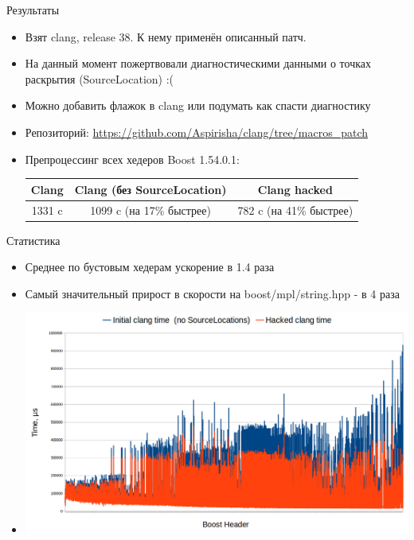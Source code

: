 \documentclass{beamer}
\begin{document}
\begin{frame}[t, fragile]{Результаты}
\begin{itemize}[<+->]
\item Взят clang, release 38. К нему применён описанный патч. 
\item На данный момент пожертвовали диагностическими данными о точках раскрытия (SourceLocation) :( 
\item Можно добавить флажок в clang или подумать как спасти диагностику
\item Репозиторий: \url{https://github.com/Aspirisha/clang/tree/macros_patch}
\item Препроцессинг всех хедеров Boost 1.54.0.1:
\begin{center}
\begin{tabular}{|c|c|c|}
\hline
Clang & Clang (без SourceLocation) & Clang hacked \\
\hline
1331 c & 1099 c (на 17\% быстрее) & 782 c (на 41\% быстрее) \\
\hline
\end{tabular}
\end{center}
\end{itemize}

\end{frame}

\begin{frame}[t, fragile]{Статистика}
\begin{itemize}[<+->]
\item Среднее по бустовым хедерам ускорение в 1.4 раза
\item Самый значительный прирост в скорости на boost/mpl/string.hpp - в 4 раза
\item \includegraphics[scale=0.2]{graph1}

\end{itemize} 
\end{frame}
\end{document}
